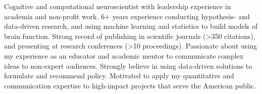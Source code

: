 

\begin{cvparagraph}

Cognitive and computational neuroscientist with leadership experience in academia and non-profit work. 6+ years experience conducting hypothesis- and data-driven research, and using machine learning and statistics to build models of brain function. Strong record of publishing in scientific journals (>350 citations), and presenting at research conferences (>10 proceedings). Passionate about using my experience as an educator and academic mentor to communicate complex ideas to non-expert audiences. Strongly believe in using data-driven solutions to formulate and recommend policy. Motivated to apply my quantitative and communication expertise to high-impact projects that serve the American public. 

\end{cvparagraph}
